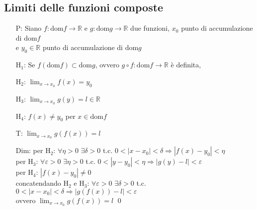 \documentclass[a4paper]{article}
\newcommand\dom{\text{dom}}
\begin{document}
\subsection{Limiti delle funzioni composte}
\begin{itemize}
	\item[P:] Siano \(f: \dom f \to \mathbb{R}\) e \(g: \dom g \to \mathbb{R}\) due funzioni, 
	\(x_0\) punto di accumulazione di \(\dom f\) \\ e \(y_0 \in \mathbb{R}\) punto di accumulazione di \(\dom g\)
	\item[H\(_1\):] Se \(f(\dom f) \subset \dom g\), ovvero \(g \circ f : \dom f \to \mathbb{R}\) è definita,
	\item[H\(_2\):] \(\displaystyle \lim_{x \to x_0} f(x) = y_0\)
	\item[H\(_3\):] \(\displaystyle \lim_{x \to x_0} g(y) = l \in \mathbb{R}\)
	\item[H\(_4\):] \(f(x) \neq y_0\) per \(x \in \dom f\)
	\item[T:] \(\displaystyle \lim_{x \to x_0} g(f(x)) = l\)
	\item[Dim:] per H\(_2\): \(\forall \eta > 0\) \(\exists \delta > 0\) t.c. \(0 < \left| x - x_0 \right| < \delta \Rightarrow \left| f(x) - y_0 \right| < \eta\) \\
	per H\(_3\): \(\forall \varepsilon > 0\) \(\exists \eta > 0\) t.c. \(0 < \left| y - y_0 \right| < \eta \Rightarrow \left| g(y) - l \right| < \varepsilon\) \\
	per H\(_4\): \(\left| f(x) - y_0 \right| \neq 0 \) \\
	concatendando H\(_2\) e H\(_3\): \(\forall \varepsilon > 0\) \(\exists \delta > 0\) t.c. \(0 < \left| x - x_0 \right| < \delta \Rightarrow \left| g(f(x)) - l \right| < \varepsilon\) \\
	ovvero \(\displaystyle \lim_{x \to x_0} g(f(x)) = l\) \qed
\end{itemize}
\end{document}
